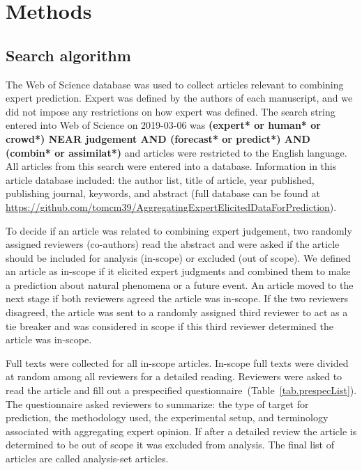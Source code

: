 \documentclass[preprint,authoryear,nonatbib]{elsarticle}
\begin{document}
\section{Methods}
\label{sec.methods}

\subsection{Search algorithm}

The Web of Science database was used to collect articles relevant to combining expert prediction.
Expert was defined by the authors of each manuscript, and we did not impose any restrictions on how expert was defined.
The search string entered into Web of Science on 2019-03-06 was \textbf{(expert* or human* or crowd*) NEAR judgement AND (forecast* or predict*) AND (combin* or assimilat*)} and articles were restricted to the English language.
All articles from this search were entered into a database.
Information in this article database included: the author list, title of article, year published, publishing journal, keywords, and abstract (full database can be found at \url{https://github.com/tomcm39/AggregatingExpertElicitedDataForPrediction}).

To decide if an article was related to combining expert judgement, two randomly assigned reviewers (co-authors) read the abstract and were asked if the article should be included for analysis (in-scope) or excluded (out of scope).
We defined an article as in-scope if it elicited expert judgments and combined them to make a prediction about natural phenomena or a future event.
An article moved to the next stage if both reviewers agreed the article was in-scope.
If the two reviewers disagreed, the article was sent to a randomly assigned third reviewer to act as a tie breaker and was considered in scope if this third reviewer determined the article was in-scope.

Full texts were collected for all in-scope articles.
In-scope full texts were divided at random among all reviewers for a detailed reading.
Reviewers were asked to read the article and fill out a prespecified questionnaire~(Table~\ref{tab.prespecList}).
The questionnaire asked reviewers to summarize: the type of target for prediction, the methodology used, the experimental setup, and terminology associated with aggregating expert opinion.
If after a detailed review the article is determined to be out of scope it was excluded from analysis.
The final list of articles are called analysis-set articles.
\end{document}
